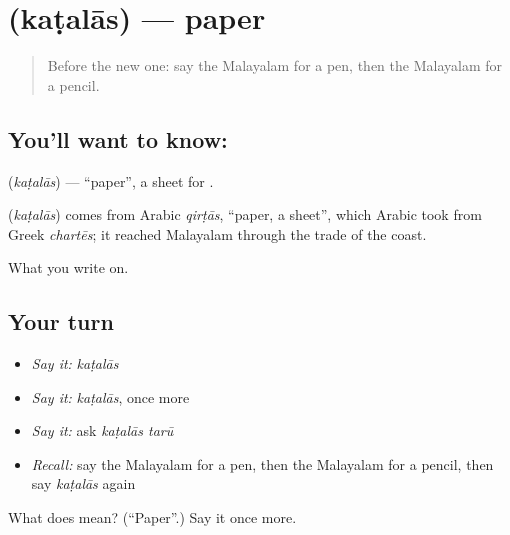 \section[\texorpdfstring{\ml{കടലാസ്} (kaṭalās)}{കടലാസ് (kaṭalās)}]{ (kaṭalās) — paper}

\label{lesson:ML-C140-paper}



\begin{quote}
Before the new one: say the Malayalam for a pen, then the Malayalam for a pencil.
\end{quote}

\subsection*{You'll want to know: }
\textbf{} (\emph{kaṭalās}) — \textquotedblleft{}paper\textquotedblright{}, a sheet for \textbf{}.

\begin{cousinweb}
\textbf{} (\emph{kaṭalās}) comes from Arabic \emph{qirṭās}, \textquotedblleft{}paper, a sheet\textquotedblright{}, which Arabic took from Greek \emph{chartēs}; it reached Malayalam through the trade of the coast.
\end{cousinweb}

\begin{grammarlens}[title={What you've built}]
What you write on.
\end{grammarlens}

\subsection*{Your turn}
\begin{itemize}
\raggedright
  \item \emph{Say it:} \emph{kaṭalās}
  \item \emph{Say it:} \emph{kaṭalās}, once more
  \item \emph{Say it:} ask \emph{kaṭalās tarū}
  \item \emph{Recall:} say the Malayalam for a pen, then the Malayalam for a pencil, then say \emph{kaṭalās} again
\end{itemize}

\begin{tcolorbox}[breakable,colback=teal!4,colframe=teal!35!black,title={Before you move on}]
What does  mean? (\textquotedblleft{}Paper\textquotedblright{}.) Say it once more.
\end{tcolorbox}
